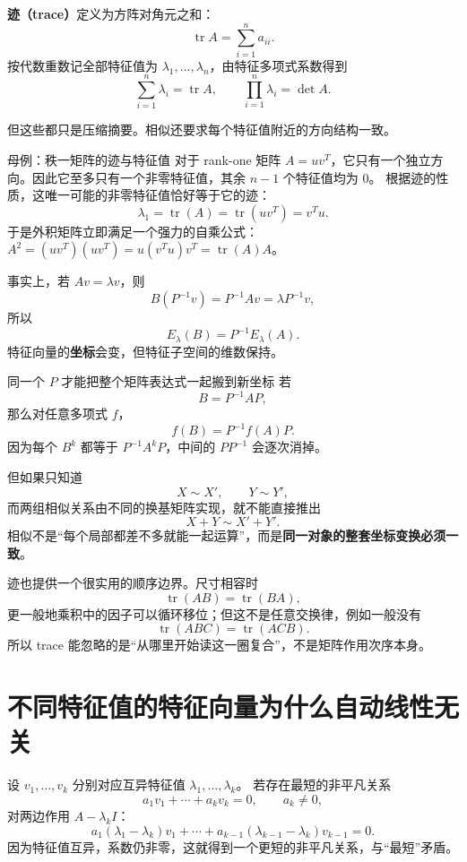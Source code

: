 \documentclass[11pt,a4paper]{ctexart}
\newcommand{\kw}[1]{\textbf{\color{deep}#1}}
\begin{document}
\kw{迹（trace）}定义为方阵对角元之和：
\[
\operatorname{tr}A=\sum_{i=1}^n a_{ii}.
\]
按代数重数记全部特征值为 $\lambda_1,\dots,\lambda_n$，由特征多项式系数得到
\[
\boxed{
\sum_{i=1}^{n}\lambda_i=\operatorname{tr}A,
\qquad
\prod_{i=1}^{n}\lambda_i=\det A.
}
\]

但这些都只是压缩摘要。相似还要求每个特征值附近的方向结构一致。

\begin{examplebox}{母例：秩一矩阵的迹与特征值}
对于 rank-one 矩阵 $A = uv^T$，它只有一个独立方向。因此它至多只有一个非零特征值，其余 $n-1$ 个特征值均为 $0$。
根据迹的性质，这唯一可能的非零特征值恰好等于它的迹：
\[
\lambda_1 = \operatorname{tr}(A) = \operatorname{tr}(uv^T) = v^Tu.
\]
于是外积矩阵立即满足一个强力的自乘公式：$A^2 = (uv^T)(uv^T) = u(v^Tu)v^T = \operatorname{tr}(A) A$。
\end{examplebox}

事实上，若 $Av=\lambda v$，则
\[
B(P^{-1}v)=P^{-1}Av=\lambda P^{-1}v,
\]
所以
\[
\boxed{E_\lambda(B)=P^{-1}E_\lambda(A).}
\]
特征向量的\kw{坐标}会变，但特征子空间的维数保持。

\begin{corebox}{同一个 $P$ 才能把整个矩阵表达式一起搬到新坐标}
若
\[
B=P^{-1}AP,
\]
那么对任意多项式 $f$，
\[
\boxed{f(B)=P^{-1}f(A)P.}
\]
因为每个 $B^k$ 都等于 $P^{-1}A^kP$，中间的 $PP^{-1}$ 会逐次消掉。

但如果只知道
\[
X\sim X',\qquad Y\sim Y',
\]
而两组相似关系由不同的换基矩阵实现，就不能直接推出
\[
X+Y\sim X'+Y'.
\]
相似不是“每个局部都差不多就能一起运算”，而是\kw{同一对象的整套坐标变换必须一致}。
\end{corebox}

迹也提供一个很实用的顺序边界。尺寸相容时
\[
\boxed{\operatorname{tr}(AB)=\operatorname{tr}(BA),}
\]
更一般地乘积中的因子可以循环移位；但这不是任意交换律，例如一般没有
\[
\operatorname{tr}(ABC)=\operatorname{tr}(ACB).
\]
所以 trace 能忽略的是“从哪里开始读这一圈复合”，不是矩阵作用次序本身。

\section{不同特征值的特征向量为什么自动线性无关}

设 $v_1,\dots,v_k$ 分别对应互异特征值 $\lambda_1,\dots,\lambda_k$。
若存在最短的非平凡关系
\[
a_1v_1+\cdots+a_kv_k=0,
\qquad a_k\neq0,
\]
对两边作用 $A-\lambda_k I$：
\[
a_1(\lambda_1-\lambda_k)v_1+\cdots+a_{k-1}(\lambda_{k-1}-\lambda_k)v_{k-1}=0.
\]
因为特征值互异，系数仍非零，这就得到一个更短的非平凡关系，与“最短”矛盾。
\end{document}
